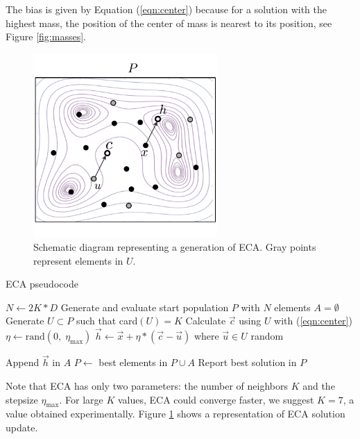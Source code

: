 \documentclass[graybox]{svmult}
\begin{document}
\begin{note}
The bias is given by Equation (\ref{eqn:center}) because for a solution 
with the highest mass, the position of the center of mass is nearest to 
its position, see Figure \ref{fig:masses}.
\end{note}

\begin{figure}[!ht]
	\sidecaption
	\includegraphics[width=7cm]{img/ecaG.pdf}
	\caption{Schematic diagram representing a generation of ECA. Gray points 
	represent elements in $U$.}
	\label{fig:ecag}       %
\end{figure}

\begin{algorithm}[!ht]
	\caption{ECA pseudocode}
	\label{algoritmoEca}
	\begin{algorithmic}[1]
		\State $N \gets 2K * D$
		\State Generate and evaluate start population $P$ with $N$ elements
			\State $A = \emptyset$
				\State Generate $U \subset P$ such that  card$(U) = K$
				\State Calculate $\vec{c}$ using $U$ with (\ref{eqn:center})
				\State $\eta \gets \text{rand}(0,\; \eta_{\max}) $ 
				\State $\vec{h} \gets \vec{x} + \eta  * (\vec{c} - \vec{u}) $ where $ \vec{u} \in U $ random
				
					\State Append $\vec{h} $ in $A$
				\EndIf
			\EndFor
			\State $P \gets $ best elements in $P \cup A$
		\EndWhile
		\State Report best solution in $P$
		\EndProcedure
	\end{algorithmic}
\end{algorithm}

Note that ECA  has only two parameters: the number of neighbors $K$ and 
the stepsize $\eta_{\max}$.  For large $K$ values, ECA could converge 
faster, we suggest $K = 7$, a value obtained experimentally. Figure \ref{fig:ecag} 
shows a representation of ECA solution update. 
\end{document}
